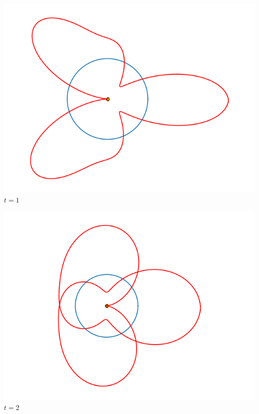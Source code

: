 \documentclass[11pt,class=report,crop=false]{standalone}
\begin{document}
\begin{center}
	\begin{minipage}{0.26\textwidth}
	\center \includegraphics[scale=\myscale,scale=0.3]{figures/fourier-9-1}
	$t = 1$ 
	\end{minipage}
	\begin{minipage}{0.24\textwidth}
	\center \includegraphics[scale=\myscale,scale=0.3]{figures/fourier-9-2}
	$t = 2$ 
	\end{minipage}
	\begin{minipage}{0.24\textwidth}

\end{minipage}
\end{center}
\end{document}
